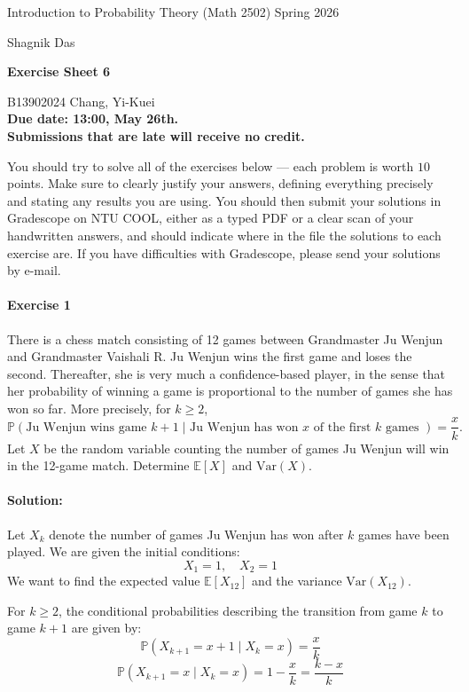 \documentclass[a4paper,12pt]{article}
\newcommand{\courseTitle}{Introduction to Probability Theory (Math 2502)}
\newcommand{\semester}{Spring 2026}
\newcommand{\instructorA}{Shagnik Das}
\newcommand{\instructorB}{}
\newcommand{\sheetNumber}{6}
\newcommand{\dueDate}{13:00, May 26th.}
\newcommand{\lateWarning}{Submissions that are late will receive no credit.}
\newcommand{\buildtitle}[4]{
\begin{flushleft}
{\large
#1
\hfill{}
#2
\par
#3
}
\end{flushleft}
\vskip 4pt
\begin{center}
{\large\bfseries#4\par}
\end{center}
\bigskip
}
\newcommand{\mb}[1]{\mathbb{#1}}
\begin{document}
\buildtitle{\courseTitle{}}{\semester}{\instructorA{} \hfill \instructorB{}}{Exercise Sheet \sheetNumber{}}

\vspace{-0.2in}

\begin{center}

{B13902024 Chang, Yi-Kuei \\ \bf Due date: \dueDate \\ \lateWarning}

\end{center}

\noindent You should try to solve all of the exercises below --- each problem is worth $10$ points. Make sure to clearly justify your answers, defining everything precisely and stating any results you are using. You should then submit your solutions in Gradescope on NTU COOL, either as a typed PDF or a clear scan of your handwritten answers, and should indicate where in the file the solutions to each exercise are. If you have difficulties with Gradescope, please send your solutions by e-mail.

\paragraph{Exercise 1}  There is a chess match consisting of 12 games between Grandmaster Ju Wenjun and Grandmaster Vaishali R. Ju Wenjun wins the first game and loses the second. Thereafter, she is very much a confidence-based player, in the sense that her probability of winning a game is proportional to the number of games she has won so far. More precisely, for $k \ge 2$,
\[ \mb{P}\left( \textrm{Ju Wenjun wins game } k+1 \; | \textrm{ Ju Wenjun has won } x \textrm{ of the first } k \textrm{ games }\right) = \frac{x}{k}. \]
Let $X$ be the random variable counting the number of games Ju Wenjun will win in the 12-game match. Determine $\mb E[X]$ and $\textrm{Var}(X)$.

\paragraph{Solution:}
Let $X_k$ denote the number of games Ju Wenjun has won after $k$ games have been played. We are given the initial conditions:
\[
X_1 = 1, \quad X_2 = 1
\]
We want to find the expected value $\mathbb{E}[X_{12}]$ and the variance $\text{Var}(X_{12})$.

For $k \ge 2$, the conditional probabilities describing the transition from game $k$ to game $k+1$ are given by:
\[
\mathbb{P}(X_{k+1} = x + 1 \mid X_k = x) = \frac{x}{k}
\]
\[
\mathbb{P}(X_{k+1} = x \mid X_k = x) = 1 - \frac{x}{k} = \frac{k - x}{k}
\]
\end{document}
